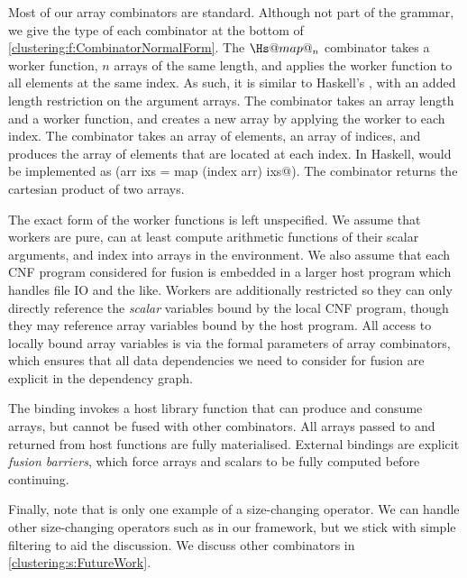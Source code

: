Most of our array combinators are standard.
Although not part of the grammar, we give the type of each combinator at the bottom of \cref{clustering:f:CombinatorNormalForm}.
The $\Hs@map@_n$ combinator takes a worker function, $n$ arrays of the same length, and applies the worker function to all elements at the same index.
As such, it is similar to Haskell's \Hs@zipWith@, with an added length restriction on the argument arrays.
The \Hs@generate@ combinator takes an array length and a worker function, and creates a new array by applying the worker to each index.
The \Hs@gather@ combinator takes an array of elements, an array of indices, and produces the array of elements that are located at each index.
In Haskell, \Hs@gather@ would be implemented as (\Hs@gather arr ixs = map (index arr) ixs@).
The \Hs@cross@ combinator returns the cartesian product of two arrays. 

The exact form of the worker functions is left unspecified.
We assume that workers are pure, can at least compute arithmetic functions of their scalar arguments, and index into arrays in the environment.
We also assume that each CNF program considered for fusion is embedded in a larger host program which handles file IO and the like.
Workers are additionally restricted so they can only directly reference the \emph{scalar} variables bound by the local CNF program, though they may reference array variables bound by the host program.
All access to locally bound array variables is via the formal parameters of array combinators, which ensures that all data dependencies we need to consider for fusion are explicit in the dependency graph.

The \Hs@external@ binding invokes a host library function that can produce and consume arrays, but cannot be fused with other combinators.
All arrays passed to and returned from host functions are fully materialised.
External bindings are explicit \emph{fusion barriers}, which force arrays and scalars to be fully computed before continuing. 

Finally, note that \Hs@filter@ is only one example of a size-changing operator.
We can handle other size-changing operators such as \Hs@slice@ in our framework, but we stick with simple filtering to aid the discussion.
We discuss other combinators in \cref{clustering:s:FutureWork}.

